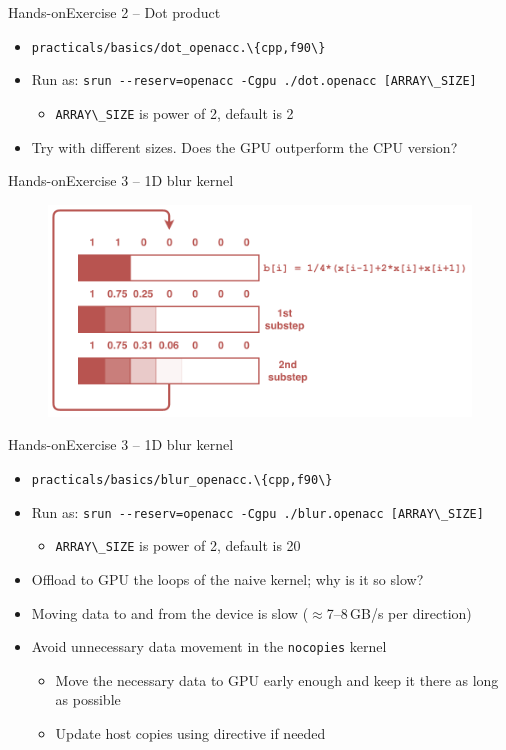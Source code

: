 \documentclass[12pt,aspectratio=169]{beamer}
\newcommand\shinline[2][]{\lstinline[style=shstyle,basicstyle=\ttfamily,#1]!#2!}
\begin{document}
\begin{frame}{Hands-on}{Exercise 2 -- Dot product}
  \begin{itemize}
  \item \shinline{practicals/basics/dot_openacc.\{cpp,f90\}}
  \item Run as: \shinline{srun --reserv=openacc -Cgpu ./dot.openacc [ARRAY\_SIZE]}
    \begin{itemize}
    \item \shinline{ARRAY\_SIZE} is power of 2, default is 2
    \end{itemize}
  \item Try with different sizes. Does the GPU outperform the CPU version?
  \end{itemize}
\end{frame}

\begin{frame}{Hands-on}{Exercise 3 -- 1D blur kernel}
  \begin{figure}
    \centering
    \includegraphics[width=.7\textwidth]{blur_twice_kernel}
  \end{figure}
\end{frame}


\begin{frame}{Hands-on}{Exercise 3 -- 1D blur kernel}
  \begin{itemize}
  \item \shinline{practicals/basics/blur_openacc.\{cpp,f90\}}
  \item Run as: \shinline{srun --reserv=openacc -Cgpu ./blur.openacc [ARRAY\_SIZE]}
    \begin{itemize}
    \item \shinline{ARRAY\_SIZE} is power of 2, default is 20
    \end{itemize}
  \item Offload to GPU the loops of the naive kernel; why is it so slow?
    \pause
    \vfill
  \item Moving data to and from the device is slow ($\approx$7--8\,GB/s per direction)
  \item Avoid unnecessary data movement in the \texttt{nocopies} kernel
    \begin{itemize}
    \item Move the necessary data to GPU early enough and keep it there as long as possible
    \item Update host copies using  directive if needed
    \end{itemize}
  \end{itemize}
\end{frame}
\end{document}
